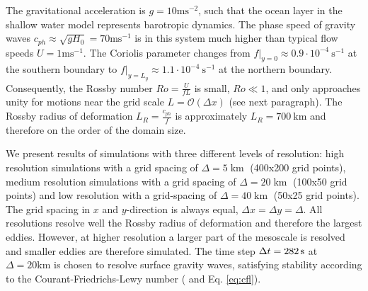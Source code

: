 The gravitational acceleration is $g = 10\mathrm{ms}^{-2}$, such that the ocean layer in the shallow water model represents
barotropic dynamics. The phase speed of gravity waves $c_{ph} \approx \sqrt{gH_0} = 70\mathrm{ms}^{-1}$ is in this system
much higher than typical flow speeds $U = 1\mathrm{ms}^{-1}$. The Coriolis parameter changes from
$f\vert_{y=0} \approx 0.9 \cdot 10^{-4}~\mathrm{s}^{-1}$ at
the southern boundary to $f\vert_{y=L_y} \approx 1.1 \cdot 10^{-4}~\mathrm{s}^{-1}$ at the northern boundary.
Consequently, the Rossby number $Ro = \tfrac{U}{fL}$ is small, $Ro \ll 1$, and only approaches unity for motions near the 
grid scale $L = \mathcal{O}(\Delta x)$ (see next paragraph). The Rossby radius of deformation $L_R = \tfrac{c_{ph}}{f}$ is
approximately $L_R = 700~\mathrm{km}$ and therefore on the order of the domain size. 

We present results of simulations with three different levels of resolution: high resolution simulations with a grid spacing of
$\Delta = 5\operatorname{km}$ (400x200 grid points), medium resolution simulations with a grid spacing of
$\Delta = 20\operatorname{km}$ (100x50 grid points) and low resolution with a grid-spacing of $\Delta = 40\operatorname{km}$
(50x25 grid points). The grid spacing in $x$ and $y$-direction is always equal, $\Delta x = \Delta y = \Delta$. 
All resolutions resolve well the Rossby radius of deformation and therefore the largest eddies. However, at higher resolution
a larger part of the mesoscale is resolved and smaller eddies are therefore simulated. The time step
$\Delta t = 282\operatorname{s}$ at $\Delta = 20\mathrm{km}$ is chosen to resolve surface gravity waves, satisfying stability according
to the Courant-Friedrichs-Lewy number (\cite{Courant1967} and Eq. \ref{eq:cfl}).

